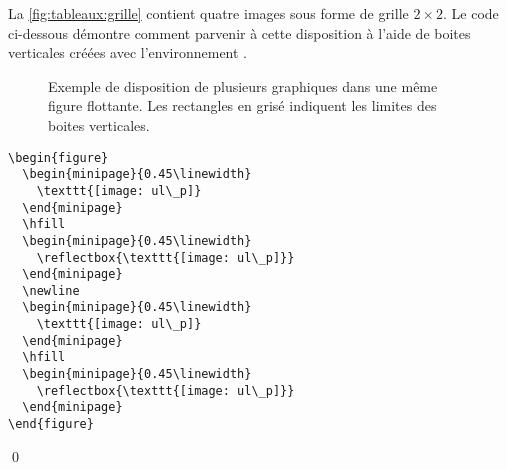 \begin{exemple}
  \label{exemple:tableaux:grille}
  La \autoref{fig:tableaux:grille} contient quatre images sous forme
  de grille $2 \times 2$. Le code ci-dessous démontre comment parvenir
  à cette disposition à l'aide de boites verticales créées avec
  l'environnement .
  \begin{figure}
    \hfill
    \newline
    \hfill
  \caption[Exemple de disposition de plusieurs graphiques dans une
  même figure flottante]{%
    Exemple de disposition de plusieurs graphiques dans une
    même figure flottante. Les rectangles en grisé indiquent les
    limites des boites verticales.}
  \label{fig:tableaux:grille}
  \end{figure}
\begin{lstlisting}
\begin{figure}
  \begin{minipage}{0.45\linewidth}
    \texttt{[image: ul\_p]}
  \end{minipage}
  \hfill
  \begin{minipage}{0.45\linewidth}
    \reflectbox{\texttt{[image: ul\_p]}}
  \end{minipage}
  \newline
  \begin{minipage}{0.45\linewidth}
    \texttt{[image: ul\_p]}
  \end{minipage}
  \hfill
  \begin{minipage}{0.45\linewidth}
    \reflectbox{\texttt{[image: ul\_p]}}
  \end{minipage}
\end{figure}
\end{lstlisting}
  \qed
\end{exemple}


